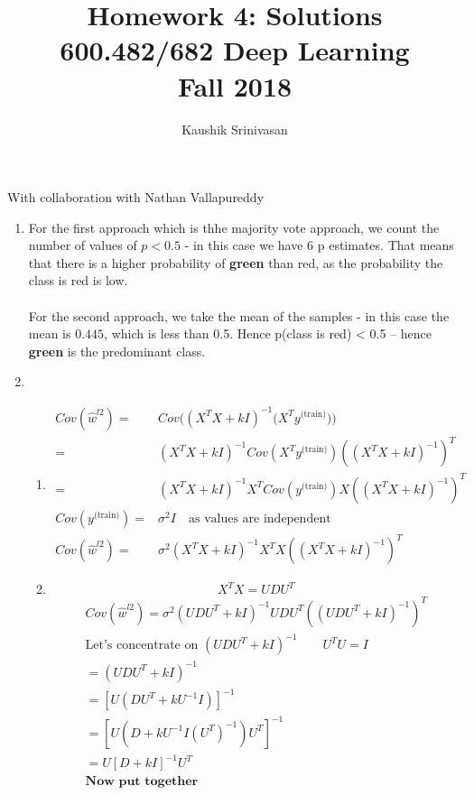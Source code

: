 \documentclass[a4paper]{article}
\title{Homework 4: Solutions\\
600.482/682 Deep Learning\\
Fall 2018}
\author{Kaushik Srinivasan}
\begin{document}
\maketitle
With collaboration with Nathan Vallapureddy

\vspace{5mm}
\begin{enumerate}
	\item For the first approach which is thhe majority vote approach, we count the number of values of $p < 0.5$ - in this case we have 6 p estimates. That means that there is a higher probability of \textbf{green} than red, as the probability the class is red is low. \\\\
	For the second approach, we take the mean of the samples - in this case the mean is $0.445$, which is less than 0.5. Hence p(class is red) < 0.5 -- hence \textbf{green} is the predominant class.
	\item 
	\begin{enumerate}
	\item 
	\begin{align*}
		Cov(\hat{w}^{l2}) = & Cov\bigg((X^T X + kI)^{-1} \big(X^T y^{\text{(train)}} \big) \bigg)\\  = & (X^T X + kI)^{-1}Cov(X^Ty^{\text{(train)}}) ((X^T X + kI)^{-1})^T\\
		= & (X^T X + kI)^{-1} X^T Cov(y^{\text{(train)}}) X ((X^T X + kI)^{-1})^T\\
		Cov(y^{\text{(train)}}) = & \sigma^2 I \quad \text{as values are independent}\\
		Cov(\hat{w}^{l2}) = & \sigma^2 (X^T X + kI)^{-1} X^T  X ((X^T X + kI)^{-1})^T
	\end{align*}
	\item 
	\begin{equation*}
		X^T X = UDU^T
	\end{equation*}
	\begin{gather*}
		Cov(\hat{w}^{l2}) = \sigma^2 (UDU^T + kI)^{-1} UDU^T ((UDU^T + kI)^{-1})^T\\
		\text{Let's concentrate on } (UDU^T + kI)^{-1} \qquad U^TU = I\\
		 = (UDU^T + kI)^{-1}\\
		 = [U(DU^T + kU^{-1}I)]^{-1}\\
 		 = [U(D + kU^{-1}I (U^T)^{-1})U^T]^{-1}\\
 		 = U [D + kI]^{-1}U^{T}\\
 		 \textbf{Now put together}\\

\end{gather*}
\end{enumerate}
\end{enumerate}
\end{document}
